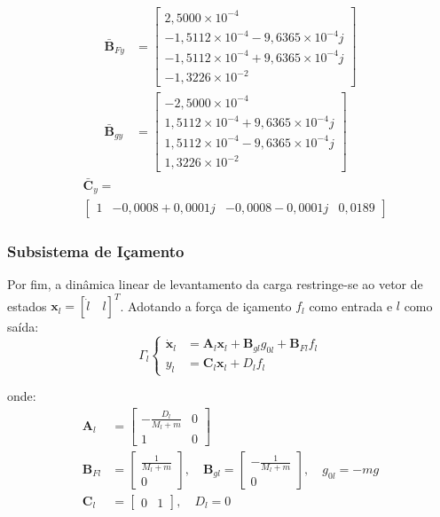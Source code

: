 \documentclass{ppgeesa}
\begin{document}
{\allowdisplaybreaks
\begin{align}
\bar{\mathbf{B}}_{Fy} &= \begin{bmatrix} 2{,}5000 \times 10^{-4} \\ -1{,}5112 \times 10^{-4} - 9{,}6365 \times 10^{-4}j \\ -1{,}5112 \times 10^{-4} + 9{,}6365 \times 10^{-4}j \\ -1{,}3226 \times 10^{-2} \end{bmatrix} \\
\bar{\mathbf{B}}_{gy} &= \begin{bmatrix} -2{,}5000 \times 10^{-4} \\ 1{,}5112 \times 10^{-4} + 9{,}6365 \times 10^{-4}j \\ 1{,}5112 \times 10^{-4} - 9{,}6365 \times 10^{-4}j \\ 1{,}3226 \times 10^{-2} \end{bmatrix}
\end{align}
}
\begin{align}
&\bar{\mathbf{C}}_y = \nonumber \\
&\begin{bmatrix} 1 & -0{,}0008 + 0{,}0001j & -0{,}0008 - 0{,}0001j & 0{,}0189 \end{bmatrix}
\end{align}

\subsubsection{Subsistema de Içamento}

Por fim, a dinâmica linear de levantamento da carga restringe-se ao vetor de estados $\mathbf{x}_l = [\dot{l}\quad l]^T$. Adotando a força de içamento $f_l$ como entrada e $l$ como saída:
\begin{equation}
    \Gamma_l
    \begin{cases}
      \dot{\mathbf{x}}_l &= \mathbf{A}_l \mathbf{x}_l + \mathbf{B}_{gl}g_{0l} + \mathbf{B}_{Fl} f_l\\
    y_l &= \mathbf{C}_l \mathbf{x}_l + D_l f_l
  \end{cases}
\end{equation}

\noindent onde:
\begin{align*}
    \mathbf{A}_l &= \begin{bmatrix} -\frac{D_l}{M_l+m} & 0 \\[6pt] 1 & 0 \end{bmatrix} \\
    \mathbf{B}_{Fl} &= \begin{bmatrix} \frac{1}{M_l+m} \\[6pt] 0 \end{bmatrix}, \quad
    \mathbf{B}_{gl} = \begin{bmatrix} -\frac{1}{M_l+m} \\[6pt] 0 \end{bmatrix}, \quad
    g_{0l} = -mg \\
    \mathbf{C}_l &= \begin{bmatrix} 0 & 1 \end{bmatrix}, \quad D_l = 0
\end{align*}
\end{document}
